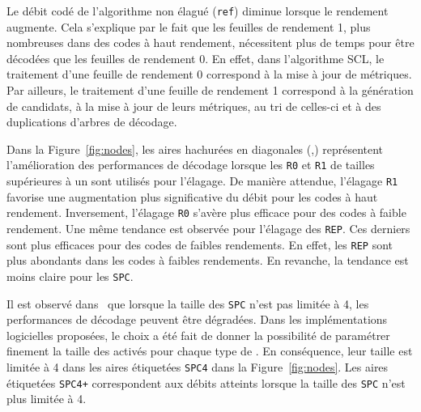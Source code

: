 Le débit codé de l'algorithme non élagué (\texttt{ref}) diminue lorsque le rendement augmente. Cela s'explique par le fait que les feuilles de rendement 1, plus nombreuses dans des codes à haut rendement, nécessitent plus de temps pour être décodées que les feuilles de rendement 0. En effet, dans l'algorithme SCL, le traitement d'une feuille de rendement 0 correspond à la mise à jour de métriques. Par ailleurs, le traitement d'une feuille de rendement 1 correspond à la génération de candidats, à la mise à jour de leurs métriques, au tri de celles-ci et à des duplications d'arbres de décodage.

Dans la Figure~\ref{fig:nodes}, les aires hachurées en diagonales (,) représentent l'amélioration des performances de décodage lorsque les \noeuds \texttt{R0} et \texttt{R1} de tailles supérieures à un sont utilisés pour l'élagage. De manière attendue, l'élagage \texttt{R1} favorise une augmentation plus significative du débit pour les codes à haut rendement. Inversement, l'élagage \texttt{R0} s'avère plus efficace pour des codes à faible rendement. Une même tendance est observée pour l'élagage des \noeuds \texttt{REP}. Ces derniers sont plus efficaces pour des codes de faibles rendements. En effet, les \noeuds \texttt{REP} sont plus abondants dans les codes à faibles rendements. En revanche, la tendance est moins claire pour les \noeuds \texttt{SPC}.

Il est observé dans~\cite{sarkis_fast_2014} que lorsque la taille des \noeuds \texttt{SPC} n'est pas limitée à 4, les performances de décodage peuvent être dégradées. Dans les implémentations logicielles proposées, le choix a été fait de donner la possibilité de paramétrer finement la taille des \noeuds activés pour chaque type de \noeuds. En conséquence, leur taille est limitée à 4 dans les aires étiquetées \texttt{SPC4} dans la Figure~\ref{fig:nodes}. Les aires étiquetées \noeuds \texttt{SPC4+} correspondent aux débits atteints lorsque la taille des \noeuds \texttt{SPC} n'est plus limitée à 4.

